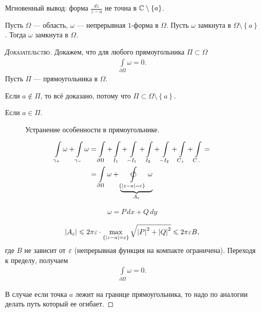 \documentclass[../complex-analysis.tex]{subfiles}
\begin{document}
Мгновенный вывод: форма $\frac{dz}{z - a}$ не точна в $\mathbb{C} \setminus \left\{ a \right\}$.

\begin{lm}
\label{lemma:ob_ustranenii_osobennosti}
 Пусть $\Omega$ --- область, $\omega$ --- непрерывная $1$-форма в $\Omega$. Пусть $\omega$ замкнута  в $\Omega \setminus \left\{ a \right\}$. Тогда $\omega$ замкнута в $\Omega$.
\end{lm}
\begin{proof}[\normalfont\textsc{Доказательство}]
 Докажем, что для любого прямоугольника $\Pi \subset \Omega$
 \begin{align*}
  \int\limits_{\partial\Pi} \omega = 0. 
 \end{align*} Пусть $\Pi$ --- прямоугольника в $\Omega$.

 Если $a \notin \Pi$, то всё доказано, потому что $\Pi \subset \Omega \setminus \left\{ a \right\}$.

 Если $a \in \Pi$.

\begin{figure}[ht]
    \centering
    \caption{Устранение особенности в прямоугольнике.}
    \label{fig:special_point_in_rectangle}
\end{figure}

\begin{align*}
 \int\limits_{\gamma_+}  \omega + \int\limits_{\gamma_-}  \omega &= \int\limits_{\partial\Pi} + \int\limits_{I_1}   + \int\limits_{-I_1}   + \int\limits_{I_2}  + \int\limits_{-I_2}   + \int\limits_{C_+}   + \int\limits_{C_-}   = \\
 &= \int\limits_{\partial\Pi} \omega + \underbrace{\varointctrclockwise\limits_{\left\{ \left| z-a \right|=\eps \right\}} \omega}_{A_{\eps}} 
\end{align*} 

\begin{align*}
 \omega = P\,dx + Q\,dy
\end{align*} 

\begin{align*}
 \left| A_{\varepsilon} \right| \leqslant 2\pi\varepsilon \cdot \max_{\left\{ \left| z-a \right|=\varepsilon \right\}} \sqrt{\left| P \right|^{2} + \left| Q \right|^{2}} \leqslant 2\pi\varepsilon B,
\end{align*} где $B$ не зависит от $\varepsilon$ (непрерывная функция на компакте ограничена). Переходя к пределу, получаем 
\begin{align*}
 \int\limits_{\partial\Pi}   \omega = 0.
\end{align*} 

В случае если точка $a$ лежит на границе прямоугольника, то надо по аналогии делать путь который ее огибает.
 
\end{proof}
\end{document}
